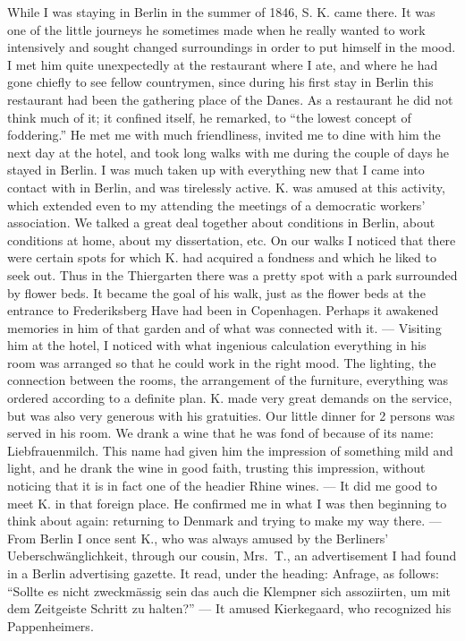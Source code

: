 \documentclass[12pt,a4paper,openany]{book}
\newcommand{\opage}[1]{\marginnote{\footnotesize\textit{[#1]}}}
\begin{document}
While I was staying in Berlin in the summer of 1846, S. K. came there. It
was one of the little journeys he sometimes made when he really wanted to
work intensively and sought changed surroundings in order to put himself
in the mood. I met him quite unexpectedly at the restaurant where I ate,
and where he had gone chiefly to see fellow countrymen, since during his
first stay in Berlin this restaurant had been the gathering place of the
Danes. As a restaurant he did not think much of it; it confined itself, he
remarked, to ``the lowest concept of foddering.'' He met me with much
friendliness, invited me to dine with him the next day at the hotel, and
took long walks with me during the couple of days he stayed in Berlin. I
was much taken up with everything new that I came into contact with in
Berlin, and was tirelessly active. K. was amused at this activity, which
extended even to my attending the meetings of a democratic workers'
association. We talked a great deal together
\opage{356}about conditions in Berlin, about conditions at home, about
my dissertation, etc. On our walks I noticed that there were certain spots
for which K. had acquired a fondness and which he liked to seek out. Thus
in the Thiergarten there was a pretty spot with a park surrounded by
flower beds. It became the goal of his walk, just as the flower beds at
the entrance to Frederiksberg Have had been in Copenhagen. Perhaps it
awakened memories in him of that garden and of what was connected with
it. --- Visiting him at the hotel, I noticed with what ingenious
calculation everything in his room was arranged so that he could work in
the right mood. The lighting, the connection between the rooms, the
arrangement of the furniture, everything was ordered according to a
definite plan. K. made very great demands on the service, but was also
very generous with his gratuities. Our little dinner for 2 persons was
served in his room. We drank a wine that he was fond of because of its
name: Liebfrauenmilch. This name had given him the impression of
something mild and light, and he drank the wine in good faith, trusting
this impression, without noticing that it is in fact one of the headier
Rhine wines. --- It did me good to meet K. in that foreign place. He
confirmed me in what I was then beginning to think about again: returning
to Denmark and trying to make my way there. --- From Berlin I once sent
K., who was always amused by the Berliners' Ueberschwänglichkeit, through
our cousin, Mrs.~T., an advertisement I had found in a Berlin advertising
gazette. It read, under the heading: Anfrage, as follows: ``Sollte es
nicht zweckmässig sein das auch die Klempner sich assoziirten, um mit dem
Zeitgeiste Schritt zu halten?'' --- It amused Kierkegaard, who
recognized his Pappenheimers.
\end{document}
